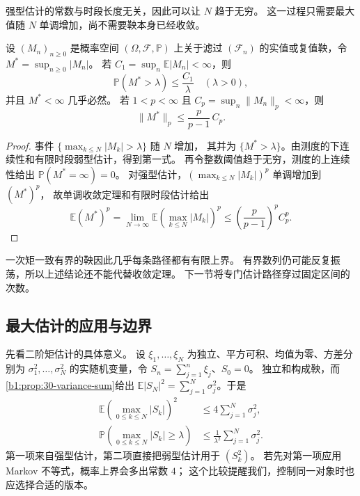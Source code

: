 强型估计的常数与时段长度无关，因此可以让 \(N\) 趋于无穷。
这一过程只需要最大值随 \(N\) 单调增加，尚不需要鞅本身已经收敛。

\begin{corollary}[无穷时段的最大估计]
\label{b1:cor:doob-infinite-horizon-31}
设 \((M_n)_{n\geq0}\) 是概率空间 \((\Omega,\mathcal F,\mathbb P)\)
上关于滤过 \((\mathcal F_n)\) 的实值或复值鞅，令
\(M^*=\sup_{n\geq0}|M_n|\)。
若 \(C_1=\sup_n\mathbb E|M_n|<\infty\)，则
\[
 \mathbb P(M^*>\lambda)\leq\frac{C_1}{\lambda}
 \quad(\lambda>0),
\]
并且 \(M^*<\infty\) 几乎必然。
若 \(1<p<\infty\) 且 \(C_p=\sup_n\|M_n\|_p<\infty\)，则
\[
 \|M^*\|_p\leq\frac p{p-1}\,C_p.
\]
\end{corollary}
\begin{proof}
事件 \(\{\max_{k\leq N}|M_k|>\lambda\}\) 随 \(N\) 增加，
其并为 \(\{M^*>\lambda\}\)。由测度的下连续性和有限时段弱型估计，得到第一式。
再令整数阈值趋于无穷，测度的上连续性给出
\(\mathbb P(M^*=\infty)=0\)。
对强型估计，\((\max_{k\leq N}|M_k|)^p\) 单调增加到 \((M^*)^p\)，
故单调收敛定理和有限时段估计给出
\[
 \mathbb E(M^*)^p
 =\lim_{N\to\infty}\mathbb E\left(\max_{k\leq N}|M_k|\right)^p
 \leq\left(\frac p{p-1}\right)^p C_p^p.
\]
\end{proof}

一次矩一致有界的鞅因此几乎每条路径都有有限上界。
有界数列仍可能反复振荡，所以上述结论还不能代替收敛定理。
下一节将专门估计路径穿过固定区间的次数。

\subsection{最大估计的应用与边界}
\label{b1:subsec:310404}

先看二阶矩估计的具体意义。
设 \(\xi_1,\ldots,\xi_N\) 为独立、平方可积、均值为零、方差分别为
\(\sigma_1^2,\ldots,\sigma_N^2\) 的实随机变量，令
\(S_n=\sum_{j=1}^n\xi_j\)、\(S_0=0\)。
独立和构成鞅，而\cref{b1:prop:30-variance-sum}给出
\(\mathbb E|S_N|^2=\sum_{j=1}^N\sigma_j^2\)。于是
\[
 \begin{aligned}
 \mathbb E\left(\max_{0\leq k\leq N}|S_k|\right)^2
 &\leq4\sum_{j=1}^N\sigma_j^2,\\
 \mathbb P\left(\max_{0\leq k\leq N}|S_k|\geq\lambda\right)
 &\leq\frac1{\lambda^2}\sum_{j=1}^N\sigma_j^2.
 \end{aligned}
\]
第一项来自强型估计，第二项直接把弱型估计用于 \((S_k^2)\)。
若先对第一项应用 Markov 不等式，概率上界会多出常数 \(4\)；
这个比较提醒我们，控制同一对象时也应选择合适的版本。

\ProseParagraphBreak

